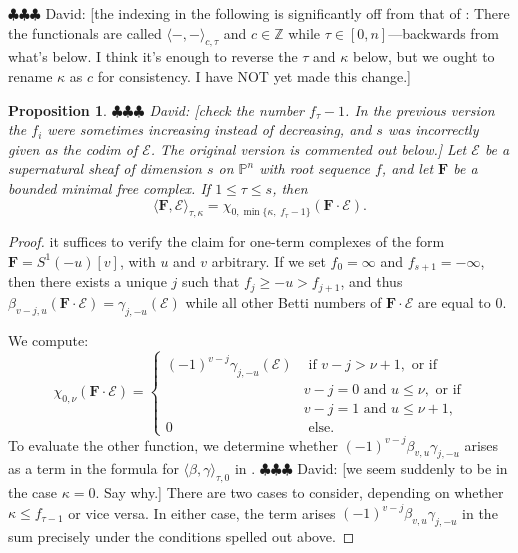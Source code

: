\documentclass[12pt]{amsart}
\newtheorem{prop}[lemma]{Proposition}
\theoremstyle{definition}
\theoremstyle{remark}
\newcommand{\PP}{\mathbb{P}}
\newcommand{\ZZ}{\mathbb{Z}}
\newcommand{\cE}{\mathcal{E}}
\newcommand{\FF}{\mathbf{F}}
\newcommand{\david}[1]{{\color{red} \sf $\clubsuit\clubsuit\clubsuit$ David: [#1]}}
\begin{document}
\david{the indexing in the following is significantly off from that of \cite{eis-schrey1}: There the
functionals are called $\langle -,-\rangle_{c,\tau}$ and $c\in \ZZ$ while $\tau \in [0,n]$---backwards
from what's below. I think it's enough to reverse the $\tau$ and $\kappa$ below, but we
ought to rename $\kappa$ as $c$ for consistency. I have NOT yet made this change.}
\begin{prop}\label{thm:categorified:2}
\david{check the number $f_{\tau}-1$. In the previous version the $f_{i}$ were sometimes
increasing instead of decreasing, and $s$ was incorrectly given as the codim of $\cE$. The original version is commented out below.} Let $\cE$ be a supernatural sheaf of dimension $s$ on $\PP^n$ with root sequence $f$, and let $\FF$ be a bounded minimal free complex. If $1\leq \tau\leq s$, then
\[
\langle \FF, \cE\rangle_{\tau,\kappa}= 
 \chi_{0, \min\{\kappa,\; f_{\tau}-1\}}(\FF\cdot \cE).
\]
\end{prop}

\begin{proof} 
it suffices to verify the claim for one-term complexes of the form $\FF=S^1(-u)[v]$, with $u$ and $v$ arbitrary.  
If we set $f_0=\infty$ and $f_{s+1}=-\infty$, then there exists a unique $j$ such that $f_j\geq -u>f_{j+1}$, and thus  $\beta_{v-j,u}(\FF\cdot \cE)=\gamma_{j,-u}(\cE)$ while all other Betti numbers  of $\FF\cdot \cE$ are equal to $0$.  

We compute:
\[
\chi_{0,\nu}(\FF\cdot \cE)=
\begin{cases}
(-1)^{v-j}\gamma_{j,-u}(\cE)&\text{ if } v-j>\nu+1, \text{ or if } \\
&v-j=0 \text{ and }  u\leq \nu, \text{ or if}\\
&v-j=1 \text{ and }  u\leq \nu+1,\\
0 & \text{ else}.
\end{cases}
\]
To evaluate the other function, we determine whether $(-1)^{v-j}\beta_{v,u} \gamma_{j,-u}$ arises as a term in the formula for $\langle \beta,\gamma\rangle_{\tau,0}$ in \cite[\S3]{eis-schrey-icm}.
\david{we seem suddenly to be in the case $\kappa=0$. Say why.}   There are two cases to consider, depending on whether $\kappa\leq f_{\tau-1}$ or vice versa.  In either case, the term arises  $(-1)^{v-j}\beta_{v,u} \gamma_{j,-u}$ in the sum precisely under the conditions spelled out above.
\end{proof}
\end{document}

